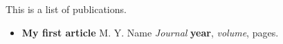 
This is a list of publications.


\begin{itemize}
  \item \textbf{My first article}
    \newline M. Y. Name
    \newline \emph{Journal} \textbf{year}, \textit{volume}, pages.
\end{itemize}

